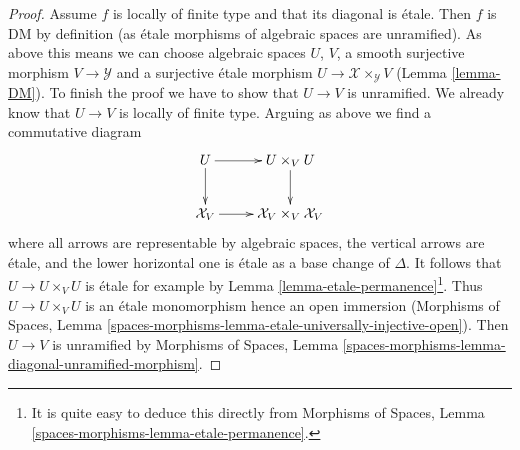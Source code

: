 \documentclass[10pt,a4paper]{amsart}
\theoremstyle{plain}
\theoremstyle{definition}
\theoremstyle{remark}
\numberwithin{equation}{subsection}
\begin{document}
\begin{proof}
\medskip\noindent
Assume $f$ is locally of finite type and that its diagonal is \'etale.
Then $f$ is DM by definition (as \'etale morphisms of algebraic spaces
are unramified). As above this means we can choose
algebraic spaces $U$, $V$, a smooth surjective morphism
$V \to \mathcal{Y}$ and a surjective \'etale morphism
$U \to \mathcal{X} \times_\mathcal{Y} V$ (Lemma \ref{lemma-DM}).
To finish the proof we have to show that $U \to V$ is unramified.
We already know that $U \to V$ is locally of finite type.
Arguing as above we find a commutative diagram
$$
\xymatrix{
U \ar[d] \ar[r] & U \times_V U \ar[d] \\
\mathcal{X}_V \ar[r] & \mathcal{X}_V \times_V \mathcal{X}_V
}
$$
where all arrows are representable by algebraic spaces,
the vertical arrows are \'etale, and the lower horizontal
one is \'etale as a base change of $\Delta$.
It follows that $U \to U \times_V U$ is \'etale
for example by Lemma \ref{lemma-etale-permanence}\footnote{It is
quite easy to deduce this directly from
Morphisms of Spaces, Lemma \ref{spaces-morphisms-lemma-etale-permanence}.}.
Thus $U \to U \times_V U$ is an \'etale monomorphism
hence an open immersion (Morphisms of Spaces, Lemma
\ref{spaces-morphisms-lemma-etale-universally-injective-open}).
Then $U \to V$ is unramified by
Morphisms of Spaces, Lemma
\ref{spaces-morphisms-lemma-diagonal-unramified-morphism}.
\end{proof}
\end{document}
